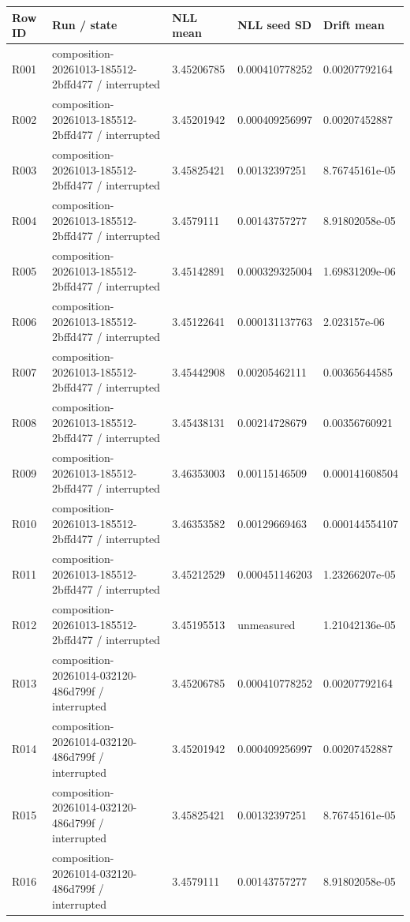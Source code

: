 \documentclass[10pt]{article}
\begin{document}
{\scriptsize\setlength{\tabcolsep}{2pt}
\begin{longtable}{p{}p{}p{}p{}p{}}
Row ID & Run / state & NLL mean & NLL seed SD & Drift mean \\
\hline\endhead
R001 & composition-20261013-185512-2bffd477 / interrupted & 3.45206785 & 0.000410778252 & 0.00207792164 \\
R002 & composition-20261013-185512-2bffd477 / interrupted & 3.45201942 & 0.000409256997 & 0.00207452887 \\
R003 & composition-20261013-185512-2bffd477 / interrupted & 3.45825421 & 0.00132397251 & 8.76745161e-05 \\
R004 & composition-20261013-185512-2bffd477 / interrupted & 3.4579111 & 0.00143757277 & 8.91802058e-05 \\
R005 & composition-20261013-185512-2bffd477 / interrupted & 3.45142891 & 0.000329325004 & 1.69831209e-06 \\
R006 & composition-20261013-185512-2bffd477 / interrupted & 3.45122641 & 0.000131137763 & 2.023157e-06 \\
R007 & composition-20261013-185512-2bffd477 / interrupted & 3.45442908 & 0.00205462111 & 0.00365644585 \\
R008 & composition-20261013-185512-2bffd477 / interrupted & 3.45438131 & 0.00214728679 & 0.00356760921 \\
R009 & composition-20261013-185512-2bffd477 / interrupted & 3.46353003 & 0.00115146509 & 0.000141608504 \\
R010 & composition-20261013-185512-2bffd477 / interrupted & 3.46353582 & 0.00129669463 & 0.000144554107 \\
R011 & composition-20261013-185512-2bffd477 / interrupted & 3.45212529 & 0.000451146203 & 1.23266207e-05 \\
R012 & composition-20261013-185512-2bffd477 / interrupted & 3.45195513 & unmeasured & 1.21042136e-05 \\
R013 & composition-20261014-032120-486d799f / interrupted & 3.45206785 & 0.000410778252 & 0.00207792164 \\
R014 & composition-20261014-032120-486d799f / interrupted & 3.45201942 & 0.000409256997 & 0.00207452887 \\
R015 & composition-20261014-032120-486d799f / interrupted & 3.45825421 & 0.00132397251 & 8.76745161e-05 \\
R016 & composition-20261014-032120-486d799f / interrupted & 3.4579111 & 0.00143757277 & 8.91802058e-05 \\

\end{longtable}}
\end{document}
